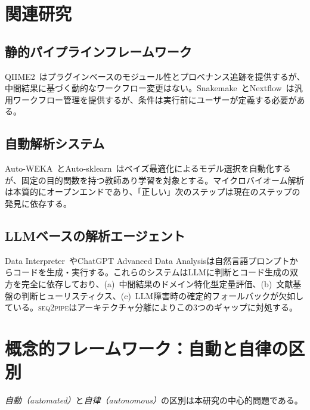 \documentclass[11pt,a4paper]{article}
\newcommand{\seqpipe}{\textsc{seq2pipe}}
\begin{document}
\section{関連研究}
\label{sec:related}

\subsection{静的パイプラインフレームワーク}

QIIME2~\citep{qiime2}はプラグインベースのモジュール性とプロベナンス追跡を提供するが、中間結果に基づく動的なワークフロー変更はない。Snakemake~\citep{snakemake}とNextflow~\citep{nextflow}は汎用ワークフロー管理を提供するが、条件は実行前にユーザーが定義する必要がある。

\subsection{自動解析システム}

Auto-WEKA~\citep{autoweka}とAuto-sklearn~\citep{autosklearn}はベイズ最適化によるモデル選択を自動化するが、固定の目的関数を持つ教師あり学習を対象とする。マイクロバイオーム解析は本質的にオープンエンドであり、「正しい」次のステップは現在のステップの発見に依存する。

\subsection{LLMベースの解析エージェント}

Data Interpreter~\citep{hong2024data}やChatGPT Advanced Data Analysisは自然言語プロンプトからコードを生成・実行する。これらのシステムはLLMに判断とコード生成の双方を完全に依存しており、(a)~中間結果のドメイン特化型定量評価、(b)~文献基盤の判断ヒューリスティクス、(c)~LLM障害時の確定的フォールバックが欠如している。\seqpipe はアーキテクチャ分離によりこの3つのギャップに対処する。

\section{概念的フレームワーク：自動と自律の区別}
\label{sec:concept}

\emph{自動（automated）}と\emph{自律（autonomous）}の区別は本研究の中心的問題である。
\end{document}
